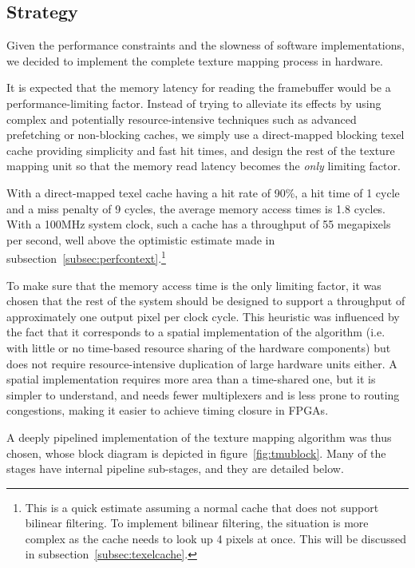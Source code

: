 \documentclass[a4paper,11pt]{kthesis}
\begin{document}
\subsection{Strategy}
\label{subsec:tmustrategy}
Given the performance constraints and the slowness of software implementations, we decided to implement the complete texture mapping process in hardware.

It is expected that the memory latency for reading the framebuffer would be a performance-limiting factor. Instead of trying to alleviate its effects by using complex and potentially resource-intensive techniques such as advanced prefetching or non-blocking caches, we simply use a direct-mapped blocking texel cache providing simplicity and fast hit times, and design the rest of the texture mapping unit so that the memory read latency becomes the \textit{only} limiting factor.

With a direct-mapped texel cache having a hit rate of 90\%, a hit time of 1 cycle and a miss penalty of 9 cycles, the average memory access times is 1.8 cycles. With a 100MHz system clock, such a cache has a throughput of 55 megapixels per second, well above the optimistic estimate made in subsection~\ref{subsec:perfcontext}.\footnote{This is a quick estimate assuming a normal cache that does not support bilinear filtering. To implement bilinear filtering, the situation is more complex as the cache needs to look up 4 pixels at once. This will be discussed in subsection~\ref{subsec:texelcache}.}

To make sure that the memory access time is the only limiting factor, it was chosen that the rest of the system should be designed to support a throughput of approximately one output pixel per clock cycle. This heuristic was influenced by the fact that it corresponds to a spatial implementation of the algorithm (i.e. with little or no time-based resource sharing of the hardware components) but does not require resource-intensive duplication of large hardware units either. A spatial implementation requires more area than a time-shared one, but it is simpler to understand, and needs fewer multiplexers and is less prone to routing congestions, making it easier to achieve timing closure in FPGAs.

A deeply pipelined implementation of the texture mapping algorithm was thus chosen, whose block diagram is depicted in figure~\ref{fig:tmublock}. Many of the stages have internal pipeline sub-stages, and they are detailed below.
\end{document}
